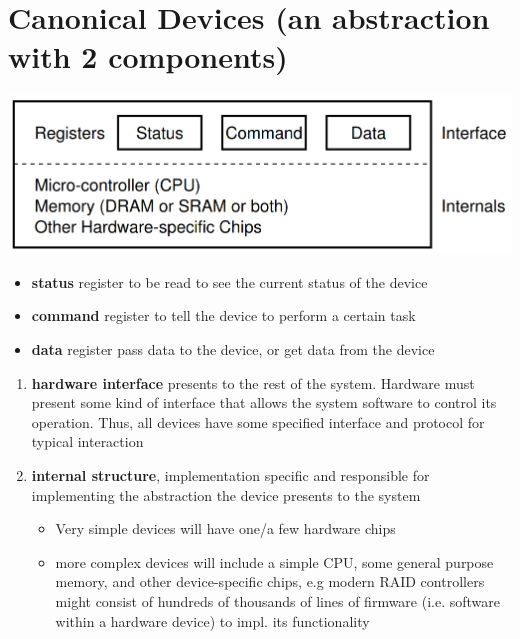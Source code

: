 \section*{Canonical Devices (an abstraction with 2 components)}
\includegraphics[width=\linewidth]{imgs/canonical_dev}
\begin{itemize}
\item \textbf{status} register to be read to see the current status of the device
\item \textbf{command} register to tell the device to perform a certain task
\item \textbf{data} register pass data to the device, or get data from
the device
\end{itemize}
\begin{enumerate}
\item \textbf{hardware interface} presents to the rest of the system. Hardware must present some kind of interface that allows the system
software to control its operation. Thus, all devices have some specified
interface and protocol for typical interaction
\item \textbf{internal structure}, implementation specific and responsible for implementing the abstraction the device presents to the system
  \begin{itemize}
  \item Very simple devices will have one/a few hardware chips
  \item more complex devices will include a simple CPU, some general purpose
memory, and other device-specific chips, e.g modern RAID controllers might consist of hundreds of thousands of lines of firmware (i.e. software within a hardware device)  to impl. its functionality
  \end{itemize}
\end{enumerate}
